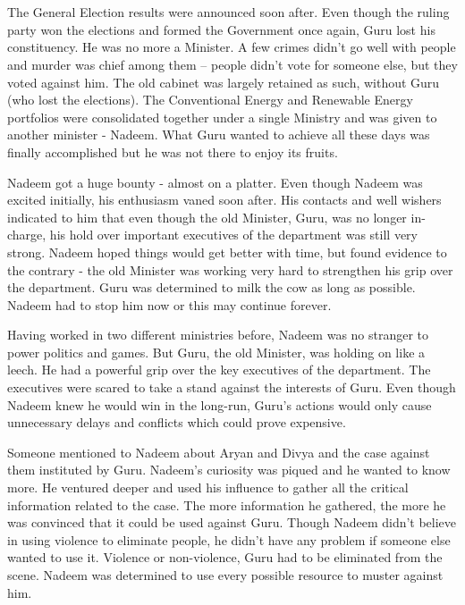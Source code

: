 \chapter{}

The General Election results were announced soon after. Even though the ruling
party won the elections and formed the Government once again, Guru lost his
constituency. He was no more a Minister. A few crimes didn't go well with people
and murder was chief among them – people didn't vote for someone else, but they
voted against him. The old cabinet was largely retained as such, without Guru
(who lost the elections). The Conventional Energy and Renewable Energy
portfolios were consolidated together under a single Ministry and was given to
another minister - Nadeem. What Guru wanted to achieve all these days was
finally accomplished but he was not there to enjoy its fruits.

Nadeem got a huge bounty - almost on a platter. Even though Nadeem was excited
initially, his enthusiasm vaned soon after. His contacts and well wishers
indicated to him that even though the old Minister, Guru, was no longer
in-charge, his hold over important executives of the department was still very
strong. Nadeem hoped things would get better with time, but found evidence to
the contrary - the old Minister was working very hard to strengthen his grip
over the department. Guru was determined to milk the cow as long as possible.
Nadeem had to stop him now or this may continue forever.

Having worked in two different ministries before, Nadeem was no stranger to
power politics and games. But Guru, the old Minister, was holding on like a
leech. He had a powerful grip over the key executives of the department. The
executives were scared to take a stand against the interests of Guru. Even
though Nadeem knew he would win in the long-run, Guru's actions would only cause
unnecessary delays and conflicts which could prove expensive.

Someone mentioned to Nadeem about Aryan and Divya and the case against them
instituted by Guru. Nadeem's curiosity was piqued and he wanted to know more. He
ventured deeper and used his influence to gather all the critical information
related to the case. The more information he gathered, the more he was convinced
that it could be used against Guru. Though Nadeem didn't believe in using
violence to eliminate people, he didn't have any problem if someone else wanted
to use it. Violence or non-violence, Guru had to be eliminated from the scene.
Nadeem was determined to use every possible resource to muster against him.

